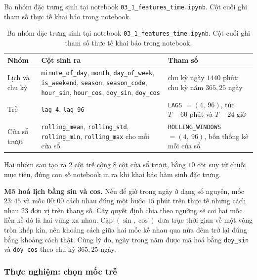 \documentclass[12pt, a4paper]{report}
\begin{document}
\begin{table}[htbp]
\centering
\caption{Ba nhóm đặc trưng sinh tại notebook \texttt{03\_1\_features\_time.ipynb}. Cột cuối ghi
tham số thực tế khai báo trong notebook.}
\label{tab:dac_trung_thoi_gian}
\small
\begin{tabular}{@{}L{2.8cm} L{6.6cm} L{4.7cm}@{}}
\toprule
\textbf{Nhóm} & \textbf{Cột sinh ra} & \textbf{Tham số} \\
\midrule
Lịch và chu kỳ &
\texttt{minute\_of\_day}, \texttt{month}, \texttt{day\_of\_week}, \texttt{is\_weekend},
\texttt{season}, \texttt{season\_code}, \texttt{hour\_sin}, \texttt{hour\_cos},
\texttt{doy\_sin}, \texttt{doy\_cos} &
chu kỳ ngày $1440$ phút; chu kỳ năm $365{,}25$ ngày \\
\addlinespace
Trễ &
\texttt{lag\_4}, \texttt{lag\_96} &
\texttt{LAGS} $= (4,\ 96)$, tức $T - 60$ phút và $T - 24$ giờ \\
\addlinespace
Cửa sổ trượt &
\texttt{rolling\_mean}, \texttt{rolling\_std}, \texttt{rolling\_min},
\texttt{rolling\_max} cho mỗi cửa sổ &
\texttt{ROLLING\_WINDOWS} $= (4,\ 96)$, bốn thống kê mỗi cửa sổ \\
\bottomrule
\end{tabular}
\caption[Ba nhóm đặc trưng sinh tại notebook \texttt{03\_1\_features\_time.ipynb}]{Ba nhóm đặc trưng sinh tại notebook \texttt{03\_1\_features\_time.ipynb}. Cột cuối ghi
tham số thực tế khai báo trong notebook.}
\label{tab:dac_trung_thoi_gian}
\end{table}

Hai nhóm sau tạo ra $2$ cột trễ cộng $8$ cột cửa sổ trượt, bằng $10$ cột suy từ chuỗi mục
tiêu, đúng con số notebook in ra khi khai báo hàm sinh đặc trưng.

\textbf{Mã hoá lịch bằng sin và cos.} Nếu để giờ trong ngày ở dạng số nguyên, mốc $23{:}45$
và mốc $00{:}00$ cách nhau đúng một bước $15$ phút trên thực tế nhưng cách nhau $23$ đơn vị
trên thang số. Cây quyết định chia theo ngưỡng sẽ coi hai mốc liền kề đó là hai vùng xa
nhau. Cặp $(\sin, \cos)$ đưa trục thời gian về một vòng tròn khép kín, nên khoảng cách giữa
hai mốc kề nhau qua nửa đêm trở lại đúng bằng khoảng cách thật. Cùng lý do, ngày trong năm
được mã hoá bằng \texttt{doy\_sin} và \texttt{doy\_cos} theo chu kỳ $365{,}25$ ngày.

\subsubsection{Thực nghiệm: chọn mốc trễ}
\end{document}
